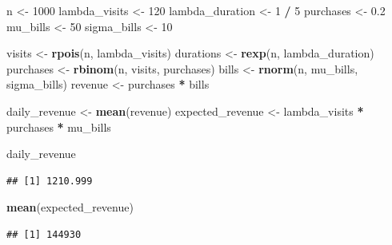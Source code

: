 \documentclass[
]{article}
\newenvironment{Shaded}{\begin{snugshade}}{\end{snugshade}}
\newcommand{\DecValTok}[1]{\textcolor[rgb]{0.00,0.00,0.81}{#1}}
\newcommand{\FloatTok}[1]{\textcolor[rgb]{0.00,0.00,0.81}{#1}}
\newcommand{\KeywordTok}[1]{\textcolor[rgb]{0.13,0.29,0.53}{\textbf{#1}}}
\newcommand{\NormalTok}[1]{#1}
\newcommand{\OperatorTok}[1]{\textcolor[rgb]{0.81,0.36,0.00}{\textbf{#1}}}
\newcommand{\StringTok}[1]{\textcolor[rgb]{0.31,0.60,0.02}{#1}}
\begin{document}
\begin{Shaded}
\begin{Highlighting}[]
\NormalTok{n \textless{}{-}}\StringTok{ }\DecValTok{1000}
\NormalTok{lambda\_visits \textless{}{-}}\StringTok{ }\DecValTok{120}
\NormalTok{lambda\_duration \textless{}{-}}\StringTok{ }\DecValTok{1} \OperatorTok{/}\StringTok{ }\DecValTok{5}
\NormalTok{purchases \textless{}{-}}\StringTok{ }\FloatTok{0.2}
\NormalTok{mu\_bills \textless{}{-}}\StringTok{ }\DecValTok{50}
\NormalTok{sigma\_bills \textless{}{-}}\StringTok{ }\DecValTok{10}

\NormalTok{visits \textless{}{-}}\StringTok{ }\KeywordTok{rpois}\NormalTok{(n, lambda\_visits)}
\NormalTok{durations \textless{}{-}}\StringTok{ }\KeywordTok{rexp}\NormalTok{(n, lambda\_duration)}
\NormalTok{purchases \textless{}{-}}\StringTok{ }\KeywordTok{rbinom}\NormalTok{(n, visits, purchases)}
\NormalTok{bills \textless{}{-}}\StringTok{ }\KeywordTok{rnorm}\NormalTok{(n, mu\_bills, sigma\_bills)}
\NormalTok{revenue \textless{}{-}}\StringTok{ }\NormalTok{purchases }\OperatorTok{*}\StringTok{ }\NormalTok{bills}

\NormalTok{daily\_revenue \textless{}{-}}\StringTok{ }\KeywordTok{mean}\NormalTok{(revenue)}
\NormalTok{expected\_revenue \textless{}{-}}\StringTok{ }\NormalTok{lambda\_visits }\OperatorTok{*}\StringTok{ }\NormalTok{purchases }\OperatorTok{*}\StringTok{ }\NormalTok{mu\_bills}

\NormalTok{daily\_revenue}
\end{Highlighting}
\end{Shaded}

\begin{verbatim}
## [1] 1210.999
\end{verbatim}

\begin{Shaded}
\begin{Highlighting}[]
\KeywordTok{mean}\NormalTok{(expected\_revenue)}
\end{Highlighting}
\end{Shaded}

\begin{verbatim}
## [1] 144930
\end{verbatim}
\end{document}
